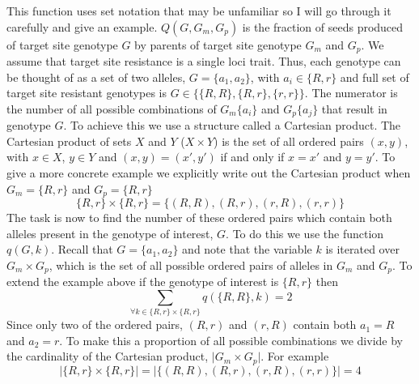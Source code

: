 \documentclass[12pt, a4paper]{article}
\begin{document}
This function uses set notation that may be unfamiliar so I will go through it carefully and give an example. $Q(G, G_m, G_p)$ is the fraction of seeds produced of target site genotype $G$ by parents of target site genotype $G_m$ and $G_p$. We assume that target site resistance is a single loci trait. Thus, each genotype can be thought of as a set of two alleles, $G = \{a_1, a_2\}$, with $a_i \in \{R, r \}$ and full set of target site resistant genotypes is $G \in \{\{R, R\}, \{R, r\}, \{r, r\} \}$. The numerator is the number of all possible combinations of $G_m\{a_i\}$ and $G_p\{a_j\}$ that result in genotype $G$. To achieve this we use a structure called a Cartesian product. The Cartesian product of sets $X$ and $Y$ ($X \times Y$) is the set of all ordered pairs $(x, y)$, with $x \in X$, $y \in Y$ and $(x, y) = (x', y')$ if and only if $x = x'$ and $y = y'$. To give a more concrete example we explicitly write out the Cartesian product when $G_m = \{R, r\}$ and $G_p = \{R, r\}$  
\begin{equation*}
	\{R, r\} \times \{R, r\} = \{(R, R), (R, r), (r, R), (r, r)\}
\end{equation*}
The task is now to find the number of these ordered pairs which contain both alleles present in the genotype of interest, $G$. To do this we use the function $q(G, k)$. Recall that $G = \{a_1, a_2\}$ and note that the variable $k$ is iterated over $G_m \times G_p$, which is the set of all possible ordered pairs of alleles in $G_m$ and $G_p$. To extend the example above if the genotype of interest is $\{R, r\}$ then 
\begin{equation*}
	\sum_{\forall k \in \{R, r\} \times \{R, r\}} q(\{R, R \}, k) = 2
\end{equation*}    
Since only two of the ordered pairs, $(R, r)$ and $(r, R)$ contain both $a_1 = R$ and $a_2 = r$. To make this a proportion of all possible combinations we divide by the cardinality of the Cartesian product, $\vert G_m \times G_p \vert$. For example 
\begin{equation*}
	\vert \{R, r\} \times \{R, r\} \vert = \vert \{(R, R), (R, r), (r, R), (r, r)\} \vert = 4
\end{equation*}
\end{document}
